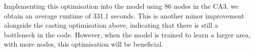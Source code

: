 Implementing this optimisation into the model using 86 nodes in the CA3, we obtain an average runtime of 331.1 seconds. 
This is another minor improvement alongside the casting optimisation above, indicating that there is still a bottleneck in the code.
However, when the model is trained to learn a larger area, with more nodes, this optimisation will be beneficial.


